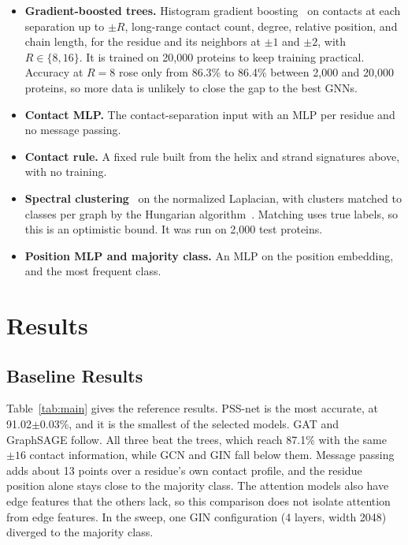 \documentclass[pdflatex,sn-mathphys-num]{sn-jnl}
\begin{document}
\begin{itemize}
    \item \textbf{Gradient-boosted trees.} Histogram gradient boosting~\cite{pedregosa2011sklearn} on contacts at each separation up to $\pm R$, long-range contact count, degree, relative position, and chain length, for the residue and its neighbors at $\pm1$ and $\pm2$, with $R \in \{8, 16\}$. It is trained on 20,000 proteins to keep training practical. Accuracy at $R=8$ rose only from 86.3\% to 86.4\% between 2,000 and 20,000 proteins, so more data is unlikely to close the gap to the best GNNs.
    \item \textbf{Contact MLP.} The contact-separation input with an MLP per residue and no message passing.
    \item \textbf{Contact rule.} A fixed rule built from the helix and strand signatures above, with no training.
    \item \textbf{Spectral clustering}~\cite{sc} on the normalized Laplacian, with clusters matched to classes per graph by the Hungarian algorithm~\cite{kuhn}. Matching uses true labels, so this is an optimistic bound. It was run on 2,000 test proteins.
    \item \textbf{Position MLP and majority class.} An MLP on the position embedding, and the most frequent class.
\end{itemize}

\section{Results}\label{sec:results}

\subsection{Baseline Results}

Table~\ref{tab:main} gives the reference results. PSS-net is the most accurate, at 91.02$\pm$0.03\%, and it is the smallest of the selected models. GAT and GraphSAGE follow. All three beat the trees, which reach 87.1\% with the same $\pm16$ contact information, while GCN and GIN fall below them. Message passing adds about 13 points over a residue's own contact profile, and the residue position alone stays close to the majority class. The attention models also have edge features that the others lack, so this comparison does not isolate attention from edge features. In the sweep, one GIN configuration (4 layers, width 2048) diverged to the majority class.
\end{document}
